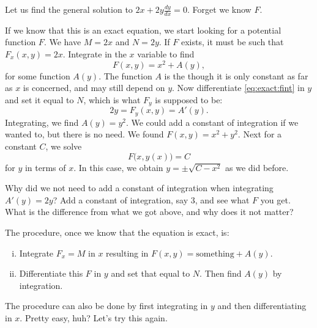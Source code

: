 \begin{example}
Let us find the general solution to
$2x + 2y \frac{dy}{dx} = 0$.  Forget we know
$F$.

If we know that this is an exact equation, we start looking for a potential
function $F$.
We have $M = 2x$ and $N=2y$.
If $F$ exists, it must be such that
$F_x (x,y) = 2x$.
Integrate in the $x$ variable to find
\begin{equation} \label{eq:exact:fint}
F(x,y) = x^2 + A(y) ,
\end{equation}
for some function $A(y)$.  The function $A$ is the  though it is only constant as far as $x$ is concerned, and
may still depend on $y$.  Now differentiate \eqref{eq:exact:fint} in $y$
and set it equal to $N$, which is what $F_y$ is supposed to be:
\begin{equation*}
2y = F_y (x,y) = A'(y) .
\end{equation*}
Integrating, we find $A(y) = y^2$.  We could add a constant of integration
if we wanted to, but there is no need.  We found $F(x,y) = x^2+y^2$.
Next for a constant $C$, we solve
\begin{equation*}
F\bigl(x,y(x)\bigr) = C
\end{equation*}
for $y$ in terms of $x$.  In this case, we obtain $y = \pm \sqrt{C-x^2}$
as we did before.
\end{example}

\begin{exercise}
Why did we not need to add a constant of integration when integrating $A'(y)
= 2y$?  Add a constant of integration, say $3$, and see what $F$ you get.
What is the difference from what we got above, and why does it not matter?
\end{exercise}



The procedure, once we know that the equation is exact, is:
\begin{enumerate}[(i)]
\item Integrate $F_x = M$ in $x$ resulting in $F(x,y) = \text{something} + A(y)$.
\item Differentiate this $F$ in $y$ and set that equal to
$N$.   Then find $A(y)$ by integration.
\end{enumerate}
The procedure can also be done by first integrating in $y$ and then
differentiating in $x$.
Pretty easy, huh?  Let's try this again.

